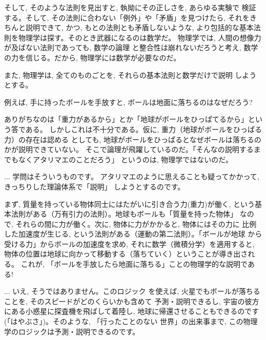 そして, そのような法則を見出すと, 執拗にその正しさを, あらゆる実験で
検証する。そして, その法則に合わない「例外」や「矛盾」を見つけたら, 
それをきちんと説明できて, かつ, もとの法則とも矛盾しないような, 
より包括的な基本法則を物理学は探す。そのとき武器になるのは数学だ。
物理学では, 人間の想像力が及ばない法則であっても, 数学の論理
と整合性は崩れないだろうと考え, 数学の力を信じる。だから, 
物理学には数学が必要なのだ。\mv

また, 物理学は, 全てのものごとを, それらの基本法則と数学だけで説明
しようとする。

例えば, 手に持ったボールを手放すと, ボールは地面に落ちるのはなぜだろう?

ありがちなのは「重力があるから」とか「地球がボールをひっぱてるから」という答である。
しかしこれは不十分である。仮に, 重力（地球がボールをひっぱる力）の存在は認める
としても, 地球がボールをひっぱるとなぜボールは落ちるのかが説明できていない。
そこで論理が飛躍しているのだ。「そんなの説明するまでもなくアタリマエのことだろう」
というのは, 物理学ではないのだ。

\begin{faq}{\small{} ... 学問はそういうものです。
アタリマエのように思えることも疑ってかかって, きっちりした理論体系で「説明」
しようとするのです。}\end{faq}

まず, 質量を持っている物体同士にはたがいに引き合う力(重力)が働く, 
という基本法則がある（万有引力の法則）。地球もボールも「質量を持った物体」
なので, それらの間に力が働く。次に, 物体に力がかかると, 物体にはその力に
比例した加速度が生じる, という法則がある（運動の第二法則）。「ボールが地球
から受ける力」からボールの加速度を求め, それに数学（微積分学）を適用すると, 
物体の位置は地球に向かって移動する（落ちていく）ということが導き出される。
これが, 「ボールを手放したら地面に落ちる」ことの物理学的な説明である!\\

\begin{faq}{\small{} ... いえ, そうではありません。このロジック
を使えば, 火星でもボールが落ちることを, そのスピードがどのくらいかも含めて
予測・説明できるし, 宇宙の彼方にある小惑星に探査機を飛ばして着陸し, 
地球に帰還させることもできるのです(「はやぶさ」)。そのような, 「行ったことのない
世界」の出来事まで, この物理学のロジックは予測・説明できるのです。}\end{faq}
\mv

